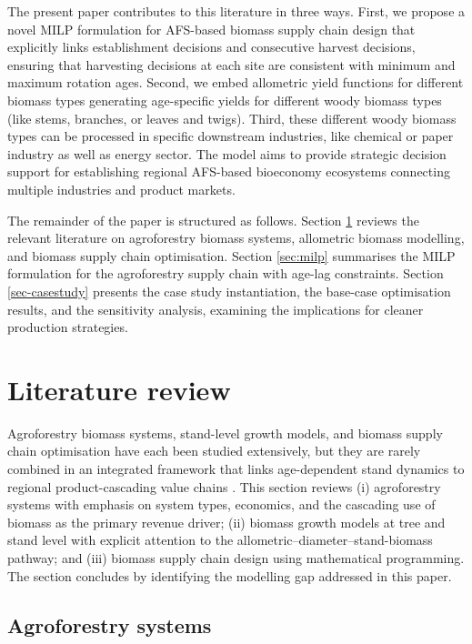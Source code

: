 \documentclass[preprint,review,1p,authoryear]{elsarticle} %
\begin{document}
The present paper contributes to this literature in three ways. First, we
propose a novel MILP formulation for AFS-based biomass supply chain
design that explicitly links establishment decisions and consecutive
harvest decisions, ensuring that harvesting decisions at each site are
consistent with minimum and maximum rotation ages. Second, we embed
allometric yield functions for different biomass types generating
age-specific yields for different woody biomass types (like stems,
branches, or leaves and twigs). Third, these different woody biomass
types can be processed in specific downstream industries, like chemical
or paper industry as well as energy sector. The model aims to provide
strategic decision support for establishing regional AFS-based
bioeconomy ecosystems connecting multiple industries and product
markets.

The remainder of the paper is structured as follows. Section
\ref{sec:litreview} reviews the relevant literature on agroforestry
biomass systems, allometric biomass modelling, and biomass supply chain
optimisation. Section \ref{sec:milp} summarises the MILP formulation
for the agroforestry supply chain with age-lag constraints. Section
\ref{sec-casestudy} presents the case study instantiation, the base-case optimisation results,
and the sensitivity analysis, examining the implications for cleaner production strategies.

\section{Literature review}\label{sec:litreview}

Agroforestry biomass systems, stand-level growth models, and biomass
supply chain optimisation have each been studied extensively, but they
are rarely combined in an integrated framework that links age-dependent
stand dynamics to regional product-cascading value chains
\citep{Zahraee2020_BSC_review, Sharma2013_BSC_review, Espinoza2017_Biorefinery_SC_review}. This section reviews (i)
agroforestry systems with emphasis on system types, economics, and the
cascading use of biomass as the primary revenue driver; (ii) biomass
growth models at tree and stand level with explicit attention to the
allometric--diameter--stand-biomass pathway; and (iii) biomass supply
chain design using mathematical programming. The section concludes by
identifying the modelling gap addressed in this paper.

\subsection{Agroforestry systems}\label{sec:lit-afs}
\end{document}
